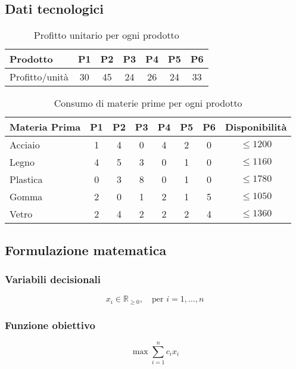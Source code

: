 \subsection{Dati tecnologici}
\begin{table}[h]
\centering
\begin{tabular}{|l|c|c|c|c|c|c|}

\hline
Prodotto      & P1 & P2 & P3 & P4 & P5 & P6 \\ \hline
Profitto/unità & 30 & 45 & 24 & 26 & 24 & 33 \\ \hline
\end{tabular}
\caption{Profitto unitario per ogni prodotto}
\end{table}

\begin{table}[h]
\centering
\begin{tabular}{|l|c|c|c|c|c|c|c|}

\hline
Materia Prima & P1 & P2 & P3 & P4 & P5 & P6 & Disponibilità \\ \hline
Acciaio     & 1  & 4  & 0  & 4  & 2  & 0  & $\leq 1200$ \\ \hline
Legno       & 4  & 5  & 3  & 0  & 1  & 0  & $\leq 1160$ \\ \hline
Plastica    & 0  & 3  & 8  & 0  & 1  & 0  & $\leq 1780$ \\ \hline
Gomma       & 2  & 0  & 1  & 2  & 1  & 5  & $\leq 1050$ \\ \hline
Vetro       & 2  & 4  & 2  & 2  & 2  & 4  & $\leq 1360$ \\ \hline
\end{tabular}
\caption{Consumo di materie prime per ogni prodotto}
\end{table}

\subsection{Formulazione matematica}

\subsubsection{Variabili decisionali}
\[ 
x_i \in \mathbb{R}_{\geq 0}, \quad \text{per } i = 1, \dots, n
\]

\subsubsection{Funzione obiettivo}
\[ 
\max \sum_{i=1}^{n} c_i x_i
\]

